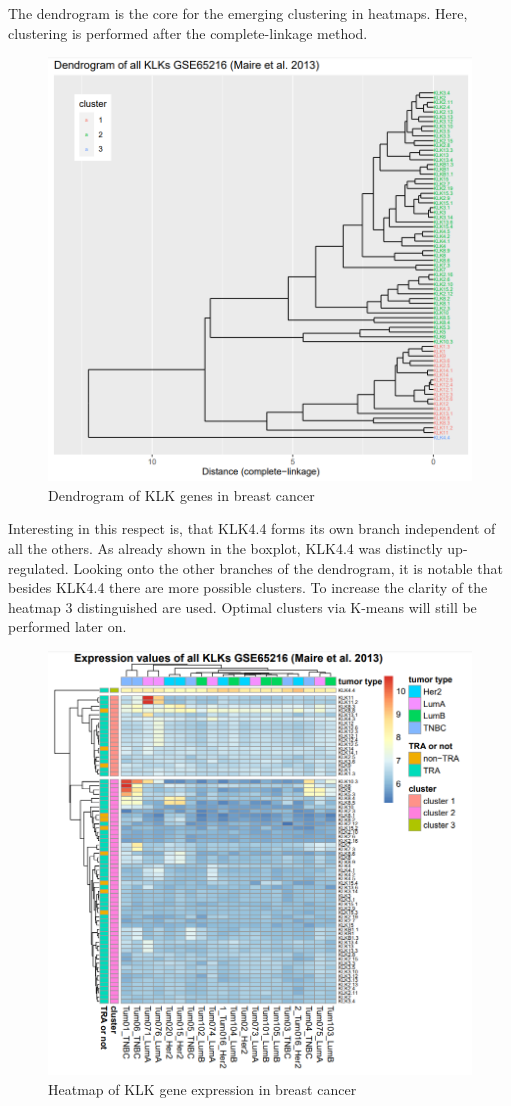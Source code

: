 \documentclass[
]{article}
\begin{document}
The dendrogram is the core for the emerging clustering in heatmaps.
Here, clustering is performed after the complete-linkage method.

\begin{figure}

{\centering \includegraphics[width=0.5\linewidth]{images/Dendrogram_breast} 

}

\caption{Dendrogram of KLK genes in breast cancer}\label{fig:Dendrogram - breast }
\end{figure}

Interesting in this respect is, that KLK4.4 forms its own branch
independent of all the others. As already shown in the boxplot, KLK4.4
was distinctly up-regulated. Looking onto the other branches of the
dendrogram, it is notable that besides KLK4.4 there are more possible
clusters. To increase the clarity of the heatmap 3 distinguished are
used. Optimal clusters via K-means will still be performed later on.\\

\begin{figure}

{\centering \includegraphics[width=0.5\linewidth]{images/Heatmap_breast} 

}

\caption{Heatmap of KLK gene expression in breast cancer}\label{fig:Heatmap - breast }
\end{figure}
\end{document}
